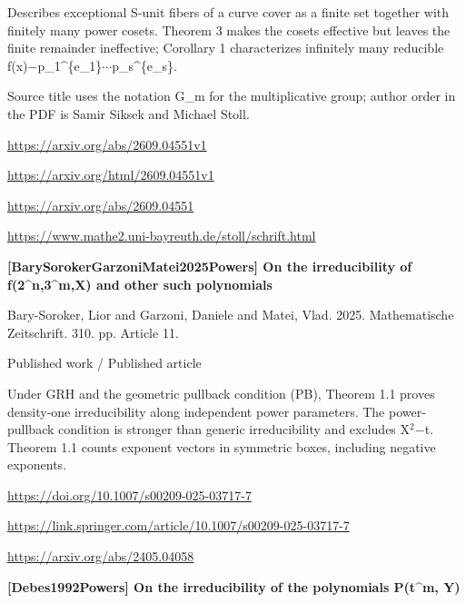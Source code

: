 \documentclass[11pt,a4paper,oneside,openany]{book}
\begin{document}
\color{black} Describes exceptional S-unit fibers of a curve cover as a finite set together with finitely many power cosets. Theorem 3 makes the cosets effective but leaves the finite remainder ineffective; Corollary 1 characterizes infinitely many reducible f(x)\ensuremath{-}p\_\allowbreak{}1\textasciicircum{}\{e\_\allowbreak{}1\}\ensuremath{\cdots}p\_\allowbreak{}s\textasciicircum{}\{e\_\allowbreak{}s\}.\par
{\small Source title uses the notation G\_\allowbreak{}m for the multiplicative group; author order in the PDF is Samir Siksek and Michael Stoll.}\par
{\footnotesize\url{https://arxiv.org/abs/2609.04551v1}}\par
{\footnotesize\url{https://arxiv.org/html/2609.04551v1}}\par
{\footnotesize\url{https://arxiv.org/abs/2609.04551}}\par
{\footnotesize\url{https://www.mathe2.uni-bayreuth.de/stoll/schrift.html}}\par
\vspace{9pt}
\hypertarget{ref:BarySorokerGarzoniMatei2025Powers}{}
{\sffamily\bfseries\color{atlasgreen}[BarySorokerGarzoniMatei2025Powers] On the irreducibility of f(2\textasciicircum{}n,3\textasciicircum{}m,X) and other such polynomials}\par
\color{black} Bary-Soroker, Lior and Garzoni, Daniele and Matei, Vlad. 2025. Mathematische Zeitschrift. 310. pp. Article 11.\par
{\small\sffamily\color{atlasgold}Published work / Published article}\par
\color{black} Under GRH and the geometric pullback condition (PB), Theorem 1.1 proves density-one irreducibility along independent power parameters. The power-pullback condition is stronger than generic irreducibility and excludes X\ensuremath{{}^2}\ensuremath{-}t. Theorem 1.1 counts exponent vectors in symmetric boxes, including negative exponents.\par
{\footnotesize\url{https://doi.org/10.1007/s00209-025-03717-7}}\par
{\footnotesize\url{https://link.springer.com/article/10.1007/s00209-025-03717-7}}\par
{\footnotesize\url{https://arxiv.org/abs/2405.04058}}\par
\vspace{9pt}
\hypertarget{ref:Debes1992Powers}{}
{\sffamily\bfseries\color{atlasgreen}[Debes1992Powers] On the irreducibility of the polynomials P(t\textasciicircum{}m, Y)}\par
\end{document}
